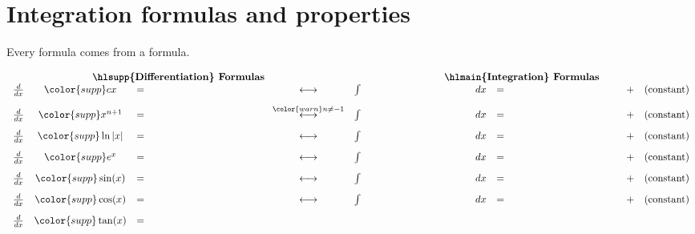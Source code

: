 \documentclass[../main.tex]{subfiles}
\begin{document}
 \section{Integration formulas and properties} \label{lession:integration-formulas}
  Every  formula comes from a  formula.

  \[
    \begin{array}{rcclcrclllcl} 
      \multicolumn{5}{c}{\text{\textbf{\hlsupp{Differentiation} Formulas}}} & \multicolumn{7}{c}{\text{\textbf{\hlmain{Integration} Formulas}}} \\
      \frac{d}{dx} & {\color{supp} cx} &=& \phantom{\color{main} c}
                   & \longleftrightarrow 
                   & \int & \phantom{\color{main} c} & dx &=& \phantom{\color{supp} cx} 
                   &+& (\text{constant}) \\[2ex]
      \frac{d}{dx} & {\color{supp} x^{n+1}  } &=& \phantom{\color{main} (n+1) x^{n}}
                   & \overset{\color{warn} n \ne -1}{\longleftrightarrow}
                   & \int & \phantom{\color{main} x^{n}} & dx &=& \phantom{\color{supp} \frac{x^{n+1}}{n+1} } 
                   &+& (\text{constant}) \\[2ex]
      \frac{d}{dx} & {\color{supp} \ln|x| } &=& \phantom{\color{main} x^{-1}}
                   & \longleftrightarrow 
                   & \int & \phantom{\color{main} x^{-1}} & dx &=& \phantom{\color{supp} \ln|x|} 
                   &+& (\text{constant}) \\[2ex]
      \frac{d}{dx} & {\color{supp} e^{x}} &=& \phantom{\color{main} e^{x}}
                   & \longleftrightarrow
                   & \int & \phantom{\color{main} e^{x}      } & dx &=& \phantom{\color{supp} e^{x}} 
                   &+& (\text{constant}) \\[2ex]
      \frac{d}{dx} & {\color{supp} \sin(x)} &=& \phantom{\color{main} \cos(x)}
                   & \longleftrightarrow 
                   & \int & \phantom{\color{main} \cos(x)} & dx &=& \phantom{\color{supp} \sin(x)} 
                   &+& (\text{constant}) \\[2ex]
      \frac{d}{dx} & {\color{supp} \cos(x)} &=& \phantom{\color{main} -\sin(x)}
                   & \longleftrightarrow 
                   & \int & \phantom{\color{main} \sin(x)} & dx &=& \phantom{\color{supp} -\cos(x)} 
                   &+& (\text{constant}) \\[2ex]
      \frac{d}{dx} & {\color{supp} \tan(x)} &=& \phantom{\color{main} \sec^{2}(x)}

\end{array}\]
\end{document}
